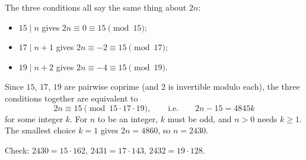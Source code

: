 The three conditions all say the same thing about $2n$:
\begin{itemize}
\item $15\mid n$ gives $2n\equiv0\equiv15\pmod{15}$;
\item $17\mid n+1$ gives $2n\equiv-2\equiv15\pmod{17}$;
\item $19\mid n+2$ gives $2n\equiv-4\equiv15\pmod{19}$.
\end{itemize}
Since $15$, $17$, $19$ are pairwise coprime (and $2$ is invertible modulo each), the three conditions together are equivalent to
\[
2n\equiv15\pmod{15\cdot17\cdot19},\qquad\text{i.e.}\qquad 2n-15=4845k
\]
for some integer $k$. For $n$ to be an integer, $k$ must be odd, and $n>0$ needs $k\ge1$. The smallest choice $k=1$ gives $2n=4860$, so $n=\boxed{2430}$.

Check: $2430=15\cdot162$, $2431=17\cdot143$, $2432=19\cdot128$.

